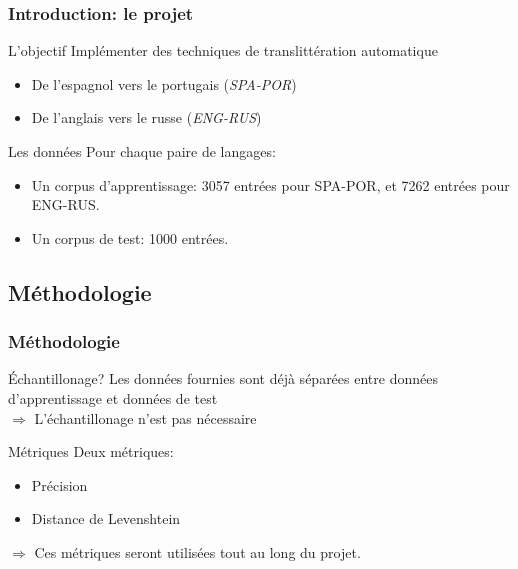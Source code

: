 \documentclass{beamer}
\begin{document}
\begin{frame}
\frametitle{Introduction: le projet}

	\begin{block}{L'objectif}
		Implémenter des techniques de translittération automatique
		\begin{itemize}
            \item De l'espagnol vers le portugais (\emph{SPA-POR})
            \item De l'anglais vers le russe (\emph{ENG-RUS})
		\end{itemize}
	\end{block}

	\begin{block}{Les données}
	Pour chaque paire de langages:		
		\begin{itemize}
            \item Un corpus d'apprentissage: 3057 entrées pour SPA-POR, et 7262 entrées pour ENG-RUS.
		\item Un corpus de test: 1000 entrées.
		\end{itemize}		
	\end{block}

\end{frame}

\subsection{Méthodologie}

\begin{frame}
\frametitle{Méthodologie}

	\begin{block}{Échantillonage?}
	Les données fournies sont déjà séparées entre données d'apprentissage et données de test\\
	$\Longrightarrow$ L'échantillonage n'est pas nécessaire
	\end{block}

	\begin{block}{Métriques}
	Deux métriques:
		\begin{itemize}
            \item Précision
            \item Distance de Levenshtein
		\end{itemize}		
	\end{block}
	
	\begin{alertblock}{}
	$\Longrightarrow$ Ces métriques seront utilisées tout au long du projet.
	\end{alertblock}	
	
\end{frame}
\end{document}
